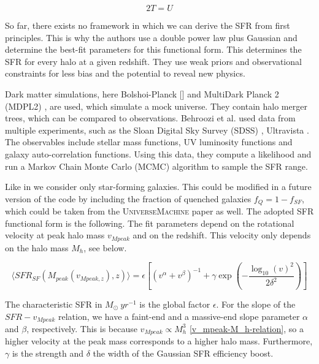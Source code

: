 \begin{equation}
    2T=U
\end{equation}

So far, there exists no framework in which we can derive the SFR from first principles. This is why the authors use a double power law plus Gaussian and determine the best-fit parameters for this functional form. This determines the SFR for every halo at a given redshift. They use weak priors and observational constraints for less bias and the potential to reveal new physics.

Dark matter simulations, here Bolshoi-Planck [\cite{klypin_dark_2011}] and MultiDark Planck 2 (MDPL2) \cite{klypin_multidark_2016}, are used, which simulate a mock universe. They contain halo merger trees, which can be compared to observations. Behroozi et al. used data from multiple experiments, such as the Sloan Digital Sky Survey (SDSS) \cite{abazajian_seventh_2009}, Ultravista \cite{mccracken_ultravista_2012}. The observables include stellar mass functions, UV luminosity functions and galaxy auto-correlation functions.
Using this data, they compute a likelihood and run a Markov Chain Monte Carlo (MCMC) algorithm to sample the SFR range.

Like in \cite{dallarmi_dipole_2022} we consider only star-forming galaxies. This could be modified in a future version of the code by including the fraction of quenched galaxies $f_Q = 1 -f_{SF}$, which could be taken from the \textsc{UniverseMachine} paper as well. The adopted SFR functional form is the following. The fit parameters depend on the rotational velocity at peak halo mass $v_{Mpeak}$ and on the redshift. This velocity only depends on the halo mass $M_h$, see below.

\begin{equation}
    \langle SFR_{SF}(M_{peak}(v_{Mpeak, z}), z)\rangle = \epsilon \left[ \left( v^\alpha + v^\beta \right)^{-1} + \gamma \exp \left(-\frac{\log_{10}(v)^2}{2\delta^2}\right) \right]
\end{equation}

The characteristic SFR  in $M_\odot\ yr^{-1}$ is the global factor $\epsilon$. For the slope of the $SFR-v_{Mpeak}$ relation, we have a faint-end and a massive-end slope parameter $\alpha$ and $\beta$, respectively. This is because $v_{Mpeak} \propto M_h^3$ \ref{v_mpeak-M_h-relation}, so a higher velocity at the peak mass corresponds to a higher halo mass.
Furthermore, $\gamma$ is the strength and $\delta$ the width of the Gaussian SFR efficiency boost. 


